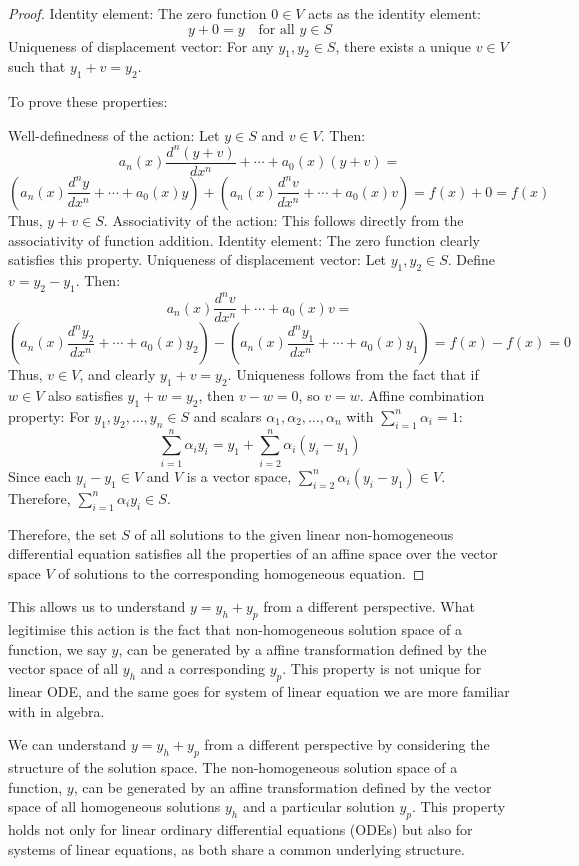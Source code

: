 \documentclass[12pt,a4paper]{article}
\begin{document}
\begin{remark}
\begin{proof}
Identity element: The zero function $0 \in V$ acts as the identity element:
\[
y + 0 = y \quad \text{for all } y \in S
\]
Uniqueness of displacement vector: For any $y_1, y_2 \in S$, there exists a unique $v \in V$ such that $y_1 + v = y_2$.

To prove these properties:

Well-definedness of the action:
Let $y \in S$ and $v \in V$. Then:
\[
a_n(x)\frac{d^n(y+v)}{dx^n} + \cdots + a_0(x)(y+v) =
\]
\[
\left(a_n(x)\frac{d^ny}{dx^n} + \cdots + a_0(x)y\right) +
\left(a_n(x)\frac{d^nv}{dx^n} + \cdots + a_0(x)v\right) = f(x) + 0 = f(x)
\]
Thus, $y + v \in S$.
Associativity of the action: This follows directly from the associativity of function addition.
Identity element: The zero function clearly satisfies this property.
Uniqueness of displacement vector:
Let $y_1, y_2 \in S$. Define $v = y_2 - y_1$. Then:
\[
a_n(x)\frac{d^nv}{dx^n} + \cdots + a_0(x)v =
\]
\[
\left(a_n(x)\frac{d^ny_2}{dx^n} + \cdots + a_0(x)y_2\right) -
\left(a_n(x)\frac{d^ny_1}{dx^n} + \cdots + a_0(x)y_1\right) = f(x) - f(x) = 0
\]
Thus, $v \in V$, and clearly $y_1 + v = y_2$. Uniqueness follows from the fact that if $w \in V$ also satisfies $y_1 + w = y_2$, then $v - w = 0$, so $v = w$.
Affine combination property:
For $y_1, y_2, \ldots, y_n \in S$ and scalars $\alpha_1, \alpha_2, \ldots, \alpha_n$ with $\sum_{i=1}^n \alpha_i = 1$:
\[
\sum_{i=1}^n \alpha_i y_i = y_1 + \sum_{i=2}^n \alpha_i (y_i - y_1)
\]
Since each $y_i - y_1 \in V$ and $V$ is a vector space, $\sum_{i=2}^n \alpha_i (y_i - y_1) \in V$.
Therefore, $\sum_{i=1}^n \alpha_i y_i \in S$.

Therefore, the set $S$ of all solutions to the given linear non-homogeneous differential equation satisfies all the properties of an affine space over the vector space $V$ of solutions to the corresponding homogeneous equation.
\end{proof}

This allows us to understand $y = y_h+y_p$ from a different perspective. What legitimise this action is the fact that non-homogeneous solution space of a function, we say $y$, can be generated by a affine transformation defined by the vector space of all $y_h$ and a corresponding $y_p$. This property is not unique for linear ODE, and the same goes for system of linear equation we are more familiar with in algebra.

We can understand \( y = y_h + y_p \) from a different perspective by considering the structure of the solution space. The non-homogeneous solution space of a function, \( y \), can be generated by an affine transformation defined by the vector space of all homogeneous solutions \( y_h \) and a particular solution \( y_p \). This property holds not only for linear ordinary differential equations (ODEs) but also for systems of linear equations, as both share a common underlying structure.

\end{remark}
\end{document}
